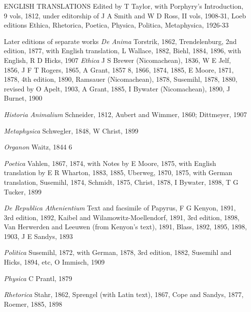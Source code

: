 ENGLISH TRANSLATIONS Edited by T Taylor, with Porphyry’s Introduction, 9
vols, 1812, under editorship of J A Smith and W D Ross, II vols, 1908-31, Loeb
editions Ethica, Rhetorica, Poetica, Physica, Politica, Metaphysica, 1926-33

Later editions of separate works \emph{De Anima} Torstrik, 1862, Trendelenburg,
2nd edition, 1877, with English translation, L Wallace, 1882, Biehl, 1884,
1896, with English, R D Hicks, 1907 \emph{Ethica} J S Brewer (Nicomachean),
1836, W E Jelf, 1856, J F T Rogers, 1865, A Grant, 1857 8, 1866, 1874, 1885, E
Moore, 1871, 1878, 4th edition, 1890, Ramsauer (Nicomachean), 1878, Susemihl,
1878, 1880, revised by O Apelt, 1903, A Grant, 1885, I Bywater (Nicomachean),
1890, J Burnet, 1900

\emph{Historia Animalium} Schneider, 1812, Aubert and Wimmer, 1860; Dittmeyer,
1907

\emph{Metaphysica} Schwegler, 1848, W Christ, 1899

\emph{Organon} Waitz, 1844 6

\emph{Poetica} Vahlen, 1867, 1874, with Notes by E Moore, 1875, with English
translation by E R Wharton, 1883, 1885, Uberweg, 1870, 1875, with German
translation, Susemihl, 1874, Schmidt, 1875, Christ, 1878, I Bywater, 1898, T G
Tucker, 1899

\emph{De Republica Athenientium} Text and facsimile of Papyrus, F G Kenyon,
1891, 3rd edition, 1892, Kaibel and Wilamowitz-Moellendorf, 1891, 3rd edition,
1898, Van Herwerden and Leeuwen (from Kenyon’s text), 1891, Blass, 1892,
1895, 1898, 1903, J E Sandys, 1893

\emph{Politica} Susemihl, 1872, with German, 1878, 3rd edition, 1882, Susemihl
and Hicks, 1894, etc, O Immisch, 1909

\emph{Physica} C Prantl, 1879

\emph{Rhetorica} Stahr, 1862, Sprengel (with Latin text), 1867, Cope and
Sandys, 1877, Roemer, 1885, 1898

